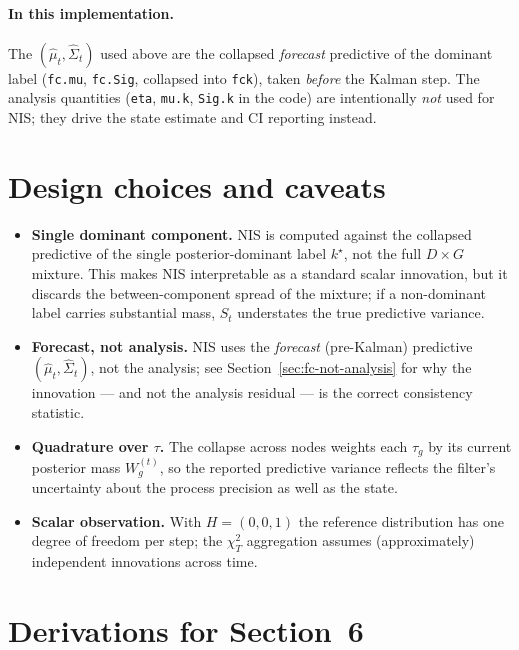 \documentclass{article}
\begin{document}
\paragraph{In this implementation.}
The $(\hat\mu_t, \hat\Sigma_t)$ used above are the collapsed \emph{forecast} predictive of
the dominant label (\lstinline{fc.mu}, \lstinline{fc.Sig}, collapsed into \lstinline{fck}),
taken \emph{before} the Kalman step. The analysis quantities (\lstinline{eta},
\lstinline{mu.k}, \lstinline{Sig.k} in the code) are intentionally \emph{not} used for NIS;
they drive the state estimate and CI reporting instead.

\section{Design choices and caveats}

\begin{itemize}
  \item \textbf{Single dominant component.} NIS is computed against the collapsed
  predictive of the single posterior-dominant label $k^\star$, not the full
  $D\times G$ mixture. This makes NIS interpretable as a standard scalar innovation, but
  it discards the between-component spread of the mixture; if a non-dominant label carries
  substantial mass, $S_t$ understates the true predictive variance.

  \item \textbf{Forecast, not analysis.} NIS uses the \emph{forecast} (pre-Kalman)
  predictive $(\hat\mu_t,\hat\Sigma_t)$, not the analysis; see
  Section~\ref{sec:fc-not-analysis} for why the innovation --- and not the analysis
  residual --- is the correct consistency statistic.

  \item \textbf{Quadrature over $\tau$.} The collapse across nodes weights each $\tau_g$
  by its current posterior mass $W_g^{(t)}$, so the reported predictive variance reflects
  the filter's uncertainty about the process precision as well as the state.

  \item \textbf{Scalar observation.} With $H=(0,0,1)$ the reference distribution has one
  degree of freedom per step; the $\chi^2_T$ aggregation assumes (approximately)
  independent innovations across time.
\end{itemize}

\appendix
\section{Derivations for Section~6}
\label{app:derivations}
\end{document}
